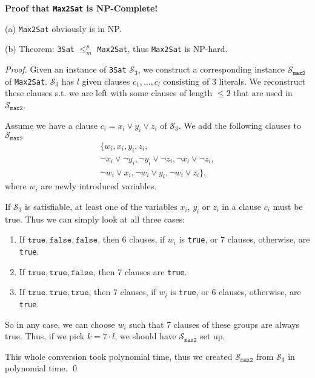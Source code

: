 \documentclass[12pt]{article}
\newcommand{\polyreduce}{$\leq_{m}^{p}$}
\begin{document}
 

 

  \textbf{Proof that \texttt{Max2Sat} is NP-Complete!}

(a) \texttt{Max2Sat} obviously is in NP.

(b) Theorem: \texttt{3Sat} \polyreduce{} \texttt{Max2Sat}, thus \texttt{Max2Sat} is NP-hard.

\vspace{.3cm}
\noindent \textit{Proof.} Given an instance of \texttt{3Sat} $\mathcal{S}_3$, we construct a corresponding instance $\mathcal{S}_{\texttt{max2}}$ of \texttt{Max2Sat}. $\mathcal{S}_3$ has $l$ given clauses $c_1,\ldots,c_l$ consisting of 3 literals. We reconstruct these clauses s.t. we are left with some clauses of length $\leq 2$ that are used in $\mathcal{S}_{\texttt{max2}}$.

Assume we have a clause $c_i=x_i\lor y_i\lor z_i$ of $\mathcal{S}_3$. We add the following clauses to $\mathcal{S}_{\texttt{max2}}$ \begin{gather*}
	\big\{w_i, x_i, y_i, z_i,\\ \lnot x_i\lor \lnot y_i, \lnot y_i\lor \lnot z_i, \lnot x_i\lor \lnot z_i, \\ \lnot w_i\lor x_i, \lnot w_i\lor y_i, \lnot w_i\lor z_i \big\},
\end{gather*} where $w_i$ are newly introduced variables.

If $\mathcal{S}_3$ is satisfiable, at least one of the variables $x_i$, $y_i$ or $z_i$ in a clause $c_i$ must be true. Thus we can simply look at all three cases: \begin{enumerate}
\item If $\texttt{true}, \texttt{false}, \texttt{false}$, then 6 clauses, if $w_i$ is \texttt{true}, or 7 clauses, otherwise, are \texttt{true}.
\item If $\texttt{true}, \texttt{true}, \texttt{false}$, then 7 clauses are \texttt{true}.
\item If $\texttt{true}, \texttt{true}, \texttt{true}$, then 7 clauses, if $w_i$ is \texttt{true}, or 6 clauses, otherwise, are \texttt{true}.
\end{enumerate} So in any case, we can choose $w_i$ such that 7 clauses of these groups are always true. Thus, if we pick $k=7\cdot l$, we should have $\mathcal{S}_{\texttt{max2}}$ set up.

This whole conversion took polynomial time, thus we created $\mathcal{S}_{\texttt{max2}}$ from $\mathcal{S}_{3}$ in polynomial time. \qed
 
\end{document}
